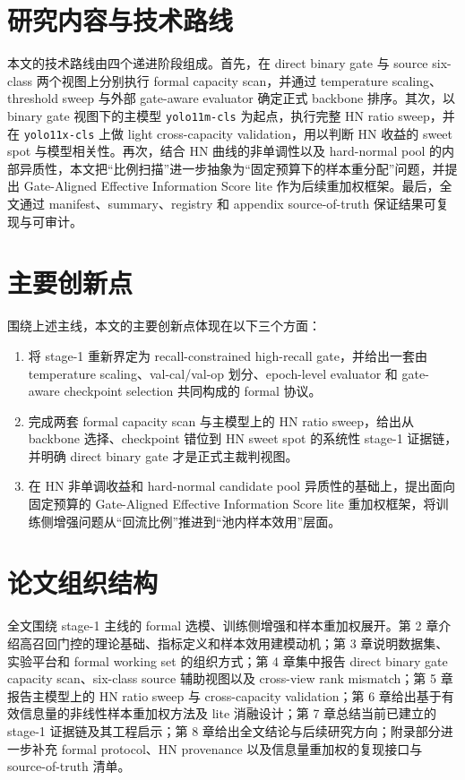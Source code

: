 \documentclass[UTF8,openany,12pt]{ctexbook}
\begin{document}
\section{研究内容与技术路线}
本文的技术路线由四个递进阶段组成。首先，在 direct binary gate 与 source six-class 两个视图上分别执行 formal capacity scan，并通过 temperature scaling、threshold sweep 与外部 gate-aware evaluator 确定正式 backbone 排序。其次，以 binary gate 视图下的主模型 \texttt{yolo11m-cls} 为起点，执行完整 HN ratio sweep，并在 \texttt{yolo11x-cls} 上做 light cross-capacity validation，用以判断 HN 收益的 sweet spot 与模型相关性。再次，结合 HN 曲线的非单调性以及 hard-normal pool 的内部异质性，本文把“比例扫描”进一步抽象为“固定预算下的样本重分配”问题，并提出 Gate-Aligned Effective Information Score lite 作为后续重加权框架。最后，全文通过 manifest、summary、registry 和 appendix source-of-truth 保证结果可复现与可审计。

\section{主要创新点}
围绕上述主线，本文的主要创新点体现在以下三个方面：
\begin{enumerate}[label=\arabic*.]
    \item 将 stage-1 重新界定为 recall-constrained high-recall gate，并给出一套由 temperature scaling、val-cal/val-op 划分、epoch-level evaluator 和 gate-aware checkpoint selection 共同构成的 formal 协议。
    \item 完成两套 formal capacity scan 与主模型上的 HN ratio sweep，给出从 backbone 选择、checkpoint 错位到 HN sweet spot 的系统性 stage-1 证据链，并明确 direct binary gate 才是正式主裁判视图。
    \item 在 HN 非单调收益和 hard-normal candidate pool 异质性的基础上，提出面向固定预算的 Gate-Aligned Effective Information Score lite 重加权框架，将训练侧增强问题从“回流比例”推进到“池内样本效用”层面。
\end{enumerate}

\section{论文组织结构}
全文围绕 stage-1 主线的 formal 选模、训练侧增强和样本重加权展开。第 2 章介绍高召回门控的理论基础、指标定义和样本效用建模动机；第 3 章说明数据集、实验平台和 formal working set 的组织方式；第 4 章集中报告 direct binary gate capacity scan、six-class source 辅助视图以及 cross-view rank mismatch；第 5 章报告主模型上的 HN ratio sweep 与 cross-capacity validation；第 6 章给出基于有效信息量的非线性样本重加权方法及 lite 消融设计；第 7 章总结当前已建立的 stage-1 证据链及其工程启示；第 8 章给出全文结论与后续研究方向；附录部分进一步补充 formal protocol、HN provenance 以及信息量重加权的复现接口与 source-of-truth 清单。
\end{document}

